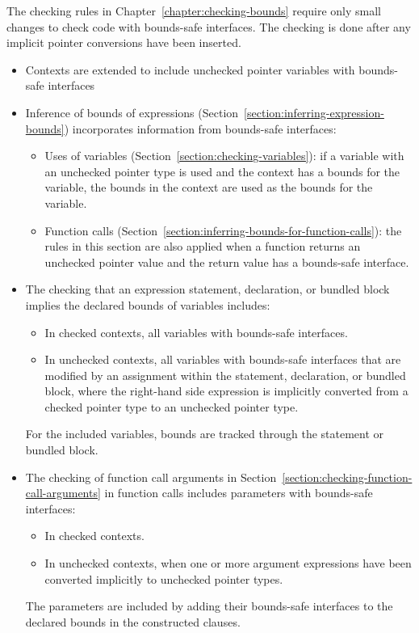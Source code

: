 The checking rules in Chapter~\ref{chapter:checking-bounds} require
only small changes to check code with bounds-safe interfaces.  The
checking is done after any implicit pointer conversions have been
inserted.
\begin{itemize}
\item Contexts are extended to include unchecked pointer variables with
      bounds-safe interfaces
\item Inference of bounds of expressions (Section~\ref{section:inferring-expression-bounds}) incorporates information from bounds-safe interfaces:
\begin{itemize}
\item Uses of variables (Section~\ref{section:checking-variables}): 
      if a variable with an unchecked pointer type is used and the context has
      a bounds for the variable, the bounds in the context are used as the bounds
      for the variable.
\item Function calls (Section~\ref{section:inferring-bounds-for-function-calls}): 
      the rules in this section are also applied when a function returns an unchecked
      pointer value and the return value has a bounds-safe interface.
\end{itemize}
\item The checking that an expression statement, declaration, or bundled
      block implies the declared bounds of variables includes:
\begin{itemize}
\item In checked contexts, all variables with bounds-safe interfaces.
\item In unchecked contexts, all variables with bounds-safe interfaces
      that are modified by an assignment within the statement, declaration,
      or bundled block, where the right-hand side expression
      is implicitly converted from a checked pointer type to an unchecked pointer type.
\end{itemize}
For the included variables, bounds are tracked through the statement or
bundled block.
\item The checking of function call arguments in
      Section~\ref{section:checking-function-call-arguments} 
      in function calls includes parameters with bounds-safe interfaces: 
\begin{itemize}
\item In checked contexts.
\item In unchecked contexts, when one or more argument expressions have been 
      converted implicitly to unchecked pointer types.
\end{itemize}
The parameters are included by adding their bounds-safe interfaces to the
declared bounds in the constructed  clauses.
\end{itemize}

